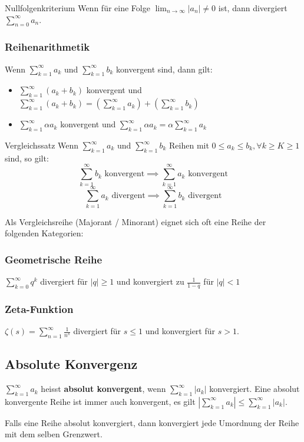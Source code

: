 \documentclass[a4paper,10pt]{article}
\def\limn{\lim_{n\to \infty}}
\def\sumk{\sum_{k=1}^\infty}
\def\sumn{\sum_{n=0}^\infty}
\begin{document}
\begin{subbox}{Nullfolgenkriterium}
	Wenn für eine Folge $\limn |a_n| \ne 0$ ist, dann divergiert $\sumn a_n$.
\end{subbox}


\subsubsection{Reihenarithmetik}
Wenn $\sumk a_k$ und $\sumk b_k$ konvergent sind, dann gilt:
\begin{itemize}
	\item $\sumk (a_k + b_k)$ konvergent und $\sumk (a_k + b_k) = \left( \sumk a_k \right) + \left( \sumk b_k \right)$
	\item $\sumk \alpha a_k$ konvergent und $\sumk \alpha a_k = \alpha \sumk a_k$
\end{itemize}


\begin{mainbox}{Vergleichssatz}
	Wenn $\sumk a_k$ und $\sumk b_k$ Reihen mit $0 \le a_k \le b_k, \forall k \ge K \ge 1$ sind, so gilt:
	$$\sumk b_k \text{ konvergent} \implies \sumk a_k \text{ konvergent}$$ 
	$$\sumk a_k \text{ divergent} \implies \sumk b_k \text{ divergent}$$ 
\end{mainbox}

Als Vergleichsreihe (Majorant / Minorant) eignet sich oft eine Reihe der folgenden Kategorien:
\subsubsection{Geometrische Reihe} 
$\sum_{k=0}^\infty q^k$ divergiert für $|q| \ge 1$ und konvergiert zu $\frac{1}{1 - q}$ für $|q| < 1$
\subsubsection{Zeta-Funktion}
$\zeta(s) = \sum_{n=1}^\infty \frac{1}{n^s}$ divergiert für $s \le 1$ und konvergiert für $s > 1$.

\subsection{Absolute Konvergenz}
$\sumk a_k$ heisst \textbf{absolut konvergent}, wenn $\sumk |a_k|$ konvergiert. Eine absolut konvergente Reihe ist immer auch konvergent, es gilt $|\sumk a_k| \le \sumk |a_k|$.

Falls eine Reihe absolut konvergiert, dann konvergiert jede Umordnung der Reihe mit dem selben Grenzwert.
\end{document}
